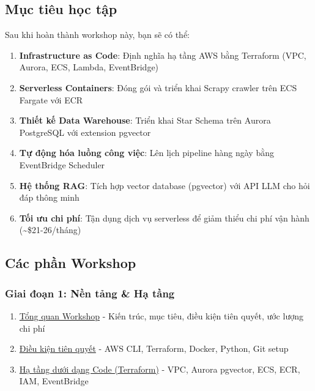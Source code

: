 \hypertarget{mux1ee5c-tiuxeau-hux1ecdc-tux1eadp}{%
\subsection{Mục tiêu học tập}}

Sau khi hoàn thành workshop này, bạn sẽ có thể:

\begin{enumerate}
\def\labelenumi{\arabic{enumi}.}
\tightlist
\item
  \textbf{Infrastructure as Code}: Định nghĩa hạ tầng AWS bằng Terraform
  (VPC, Aurora, ECS, Lambda, EventBridge)
\item
  \textbf{Serverless Containers}: Đóng gói và triển khai Scrapy crawler
  trên ECS Fargate với ECR
\item
  \textbf{Thiết kế Data Warehouse}: Triển khai Star Schema trên Aurora
  PostgreSQL với extension pgvector
\item
  \textbf{Tự động hóa luồng công việc}: Lên lịch pipeline hàng ngày bằng
  EventBridge Scheduler
\item
  \textbf{Hệ thống RAG}: Tích hợp vector database (pgvector) với API LLM
  cho hỏi đáp thông minh
\item
  \textbf{Tối ưu chi phí}: Tận dụng dịch vụ serverless để giảm thiểu chi
  phí vận hành (\textasciitilde\$21-26/tháng)
\end{enumerate}

\hypertarget{cuxe1c-phux1ea7n-workshop}{%
\subsection{Các phần Workshop}}

\hypertarget{giai-ux111oux1ea1n-1-nux1ec1n-tux1ea3ng-hux1ea1-tux1ea7ng}{%
\subsubsection{Giai đoạn 1: Nền tảng \& Hạ
tầng}}

\begin{enumerate}
\def\labelenumi{\arabic{enumi}.}
\tightlist
\item
  \href{5.1-Workshop-overview/}{Tổng quan Workshop} - Kiến trúc, mục
  tiêu, điều kiện tiên quyết, ước lượng chi phí
\item
  \href{5.2-Prerequisites/}{Điều kiện tiên quyết} - AWS CLI, Terraform,
  Docker, Python, Git setup
\item
  \href{5.3-Infrastructure/}{Hạ tầng dưới dạng Code (Terraform)} - VPC,
  Aurora pgvector, ECS, ECR, IAM, EventBridge
\end{enumerate}

